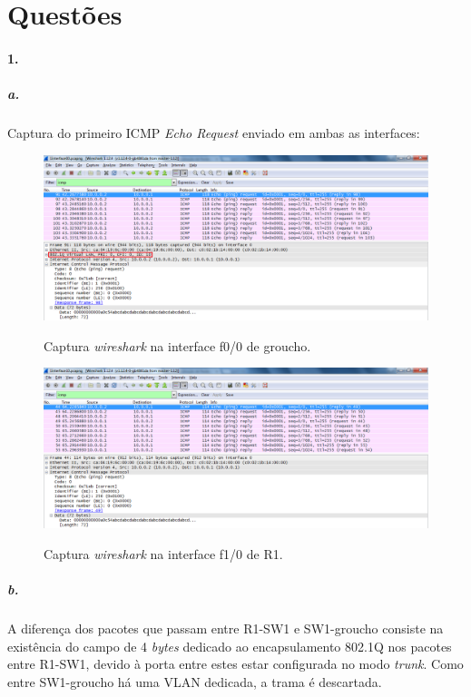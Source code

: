 \section*{Questões}
\paragraph{1.}

\subparagraph{a.}
Captura do primeiro ICMP \emph{Echo Request} enviado em ambas as interfaces:

\begin{figure}[h]
\centering
\includegraphics[width=1\textwidth, height=0.32\textheight]{1_interface00-groucho.png}
\label{fig:2-capturaWireshark}
\caption{Captura \emph{wireshark} na interface \textsf{f0/0} de \textsf{groucho}.}
\end{figure}

\begin{figure}[h]
\centering
\includegraphics[width=1\textwidth, height=0.32\textheight]{1_interface10-R1.png}
\label{fig:3-capturaWireshark}
\caption{Captura \emph{wireshark} na interface \textsf{f1/0} de \textsf{R1}.}
\end{figure}


\subparagraph{b.}
A diferença dos pacotes que passam entre \textsf{R1}-\textsf{SW1} e \textsf{SW1}-\textsf{groucho} consiste na existência do campo de 4 \emph{bytes} dedicado ao encapsulamento \textsf{802.1Q} nos pacotes entre \textsf{R1}-\textsf{SW1}, devido à porta entre estes estar configurada no modo \emph{trunk}. Como entre \textsf{SW1}-\textsf{groucho} há uma VLAN dedicada, a trama é descartada.


